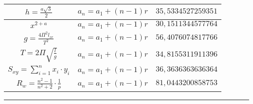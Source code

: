 \documentclass{article}
\begin{document}
\begin{flushleft}
\begin{longtable}{|c|c|c|}
$h=\frac{a\sqrt{3}}{2}$ & $a_n=a_1+(n-1)r$ & $35,5334527259351$ \\ \hline 
$x^{2+a}$ & $a_n=a_1+(n-1)r$ & $30,1511344577764$ \\ \hline 
$g=\frac{4\Pi ^2l_{zr}}{T^2}$ & $a_n=a_1+(n-1)r$ & $56,4076074817766$ \\ \hline 
$T=2\Pi \sqrt{\frac{l}{g}}$ & $a_n=a_1+(n-1)r$ & $34,8155311911396$ \\ \hline 
$S_{xy}=\sum_{i=1}^{n}x_i\cdot y_i$ & $a_n=a_1+(n-1)r$ & $36,3636363636364$ \\ \hline 
$R_w=\frac{n^2-1}{n^2+2}\cdot \frac{1}{p}$ & $a_n=a_1+(n-1)r$ & $81,0443200858753$ \\ \hline 
\end{longtable} 

\end{flushleft}
\hrule
\end{document}
